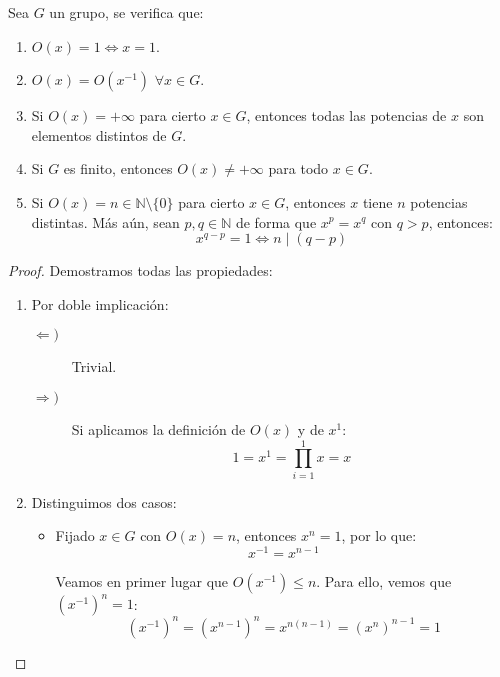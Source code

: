\begin{prop}\label{prop:orden_grupo}
    Sea $G$ un grupo, se verifica que:
    \begin{enumerate}
        \item $O(x)=1\Longleftrightarrow x=1$.
        \item $O(x)=O(x^{-1})$ $\forall x\in G$. 
        \item Si $O(x)=+\infty$ para cierto $x\in G$, entonces todas las potencias de $x$ son elementos distintos de $G$.
        \item Si $G$ es finito, entonces $O(x)\neq +\infty$ para todo $x\in G$. 
        \item Si $O(x) = n\in \mathbb{N}\setminus\{0\}$ para cierto $x\in G$, entonces $x$ tiene $n$ potencias distintas. Más aún, sean $p,q\in \mathbb{N}$ de forma que $x^p = x^q$ con $q>p$, entonces:
            \begin{equation*}
                x^{q-p} = 1 \Longleftrightarrow n\mid (q-p)
            \end{equation*}
    \end{enumerate}
    \begin{proof}
        Demostramos todas las propiedades:
        \begin{enumerate}
            \item Por doble implicación:
                \begin{description}
                    \item [$\Longleftarrow)$] Trivial.
                    \item [$\Longrightarrow)$] Si aplicamos la definición de $O(x)$ y de $x^1$:
                        \begin{equation*}
                            1 = x^1 = \prod_{i=1}^{1} x = x
                        \end{equation*}
                \end{description}
            \item %
                Distinguimos dos casos:
                \begin{itemize}
                    \item Fijado $x\in G$ con $O(x)=n$, entonces $x^n = 1$, por lo que:
                    \begin{equation*}
                        x^{-1} = x^{n-1}
                    \end{equation*}

                    Veamos en primer lugar que $O(x^{-1})\leq n$. Para ello, vemos que $\left(x^{-1}\right)^{n}=1$:
                    \begin{equation*}
                        \left(x^{-1}\right)^{n} = \left(x^{n-1}\right)^{n} = x^{n(n-1)} = {\left(x^n\right)}^{n-1}= 1
                    \end{equation*}


\end{itemize}
\end{enumerate}
\end{proof}
\end{prop}
